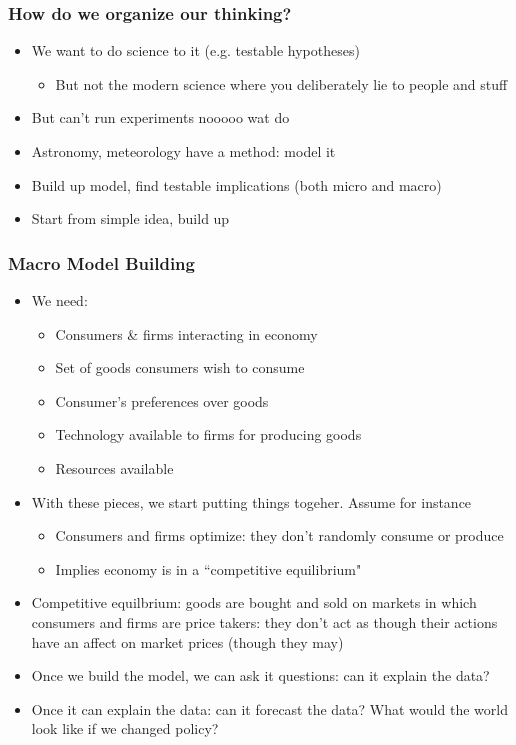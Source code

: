 \documentclass{beamer}
\begin{document}
\begin{frame}
\frametitle[alignment=center]{How do we organize our thinking?}
\begin{itemize}
\item We want to do science to it (e.g. testable hypotheses)
\bigskip
\begin{itemize}
\item But not the modern science where you deliberately lie to people and stuff
\end{itemize}
\bigskip
\item But can't run experiments nooooo wat do
\bigskip
\item Astronomy, meteorology have a method:  model it
\bigskip
\item Build up model, find testable implications (both micro and macro)
\bigskip
\item Start from simple idea, build up
\end{itemize}
\end{frame}


\begin{frame}
\frametitle[alignment=center]{Macro Model Building}
\begin{itemize}
\item We need:
\begin{itemize}
\item Consumers \& firms interacting in economy
\item Set of goods consumers wish to consume
\item Consumer's preferences over goods
\item Technology available to firms for producing goods
\item Resources available
\end{itemize}
\item With these pieces, we start putting things togeher.  Assume for instance
\begin{itemize}
\item Consumers and firms optimize:  they don't randomly consume or produce
\item Implies economy is in a ``competitive equilibrium"
\end{itemize}
\item Competitive equilbrium:  goods are bought and sold on markets in which consumers and firms are price takers:  they don't act as though their actions have an affect on market prices (though they may)
\item Once we build the model, we can ask it questions: can it explain the data?
\item Once it can explain the data: can it forecast the data?  What would the world look like if we changed policy?
\end{itemize}
\end{frame}
\end{document}
